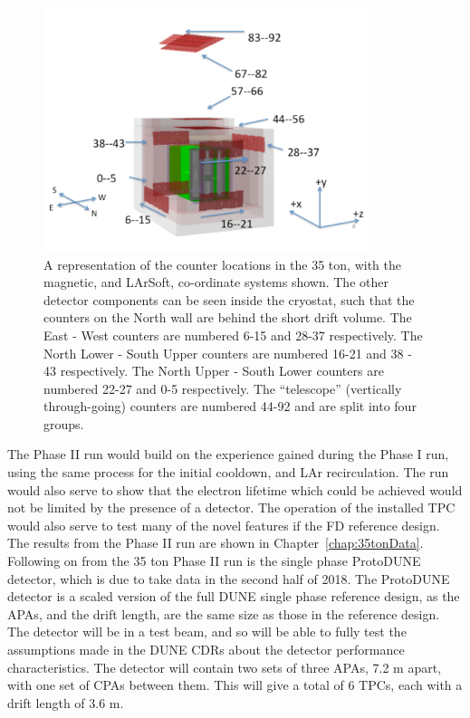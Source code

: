 \begin{figure}
  \centering
  \includegraphics[width=0.85\textwidth]{35tonFullDetect}
  \caption[A representation of the counter locations in the 35 ton]
          {A representation of the counter locations in the 35 ton, with the magnetic, and LArSoft, co-ordinate systems shown. The other detector components can be seen inside the cryostat, such that the counters on the North wall are behind the short drift volume. The East - West counters are numbered 6-15 and 28-37 respectively. The North Lower - South Upper counters are numbered 16-21 and 38 - 43 respectively. The North Upper - South Lower counters are numbered 22-27 and 0-5 respectively. The ``telescope'' (vertically through-going) counters are numbered 44-92 and are split into four groups.}
  \label{fig:35tonCounterLoc}
\end{figure}

The Phase II run would build on the experience gained during the Phase I run, using the same process for the initial cooldown, and LAr recirculation. The run would also serve to show that the electron lifetime which could be achieved would not be limited by the presence of a detector. The operation of the installed TPC would also serve to test many of the novel features if the FD reference design. The results from the Phase II run are shown in Chapter~\ref{chap:35tonData}. \\

Following on from the 35 ton Phase II run is the single phase ProtoDUNE detector, which is due to take data in the second half of 2018. The ProtoDUNE detector is a scaled version of the full DUNE single phase reference design, as the APAs, and the drift length, are the same size as those in the reference design. The detector will be in a test beam, and so will be able to fully test the assumptions made in the DUNE CDRs about the detector performance characteristics. The detector will contain two sets of three APAs, 7.2 m apart, with one set of CPAs between them. This will give a total of 6 TPCs, each with a drift length of 3.6 m. \\


